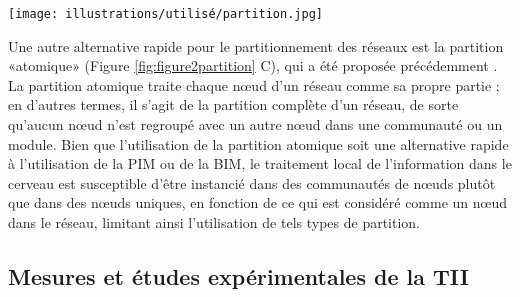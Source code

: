\begin{figure*}[!t]
\center
\texttt{[image: illustrations/utilisé/partition.jpg]}
\caption[Options de partitionnement d'un réseau]{Options de partitionnement d'un réseau. Les ellipses grises délimitent la partition à travers laquelle les informations intégrées sont évaluées. A) Exemple d'un petit réseau. Afin de calculer l'information intégrée dans ce réseau, la plupart des mesures nécessitent de diviser le réseau en une certaine partition et de voir combien d'information supplémentaire le réseau entier transporte par rapport à la somme de ses parties. B) La «bipartition d'information minimale» (BIM) du réseau. La BIM est la partition  qui sépare le système en deux parties et à travers laquelle il y a le moins de flux d'information. C) La «partition de modularité maximale» (PMM). La PMM divise un réseau en modules. La définition d'un module est que ses nœuds sont plus densément connectés les uns aux autres qu'ils ne le sont aux nœuds extérieurs au module. D) La «partition atomique». La partition atomique traite chaque nœud comme sa propre partie. Adapté de \cite{toker2016moving}.}
\label{fig:figure2partition}
\end{figure*}

Une autre alternative rapide pour le partitionnement des réseaux est la partition «atomique» (Figure \ref{fig:figure2partition} C), qui a été proposée précédemment \citep{oizumi2016measuring}. 
La partition atomique traite chaque nœud d'un réseau comme sa propre partie ; en d'autres termes, il s'agit de la partition complète d'un réseau, de sorte qu'aucun nœud n'est regroupé avec un autre nœud dans une communauté ou un module. Bien que l'utilisation de la partition atomique soit une alternative rapide à l'utilisation de la PIM ou de la BIM, le traitement local de l'information dans le cerveau est susceptible d'être instancié dans des communautés de nœuds plutôt que dans des nœuds uniques, en fonction de ce qui est considéré comme un nœud dans le réseau, limitant ainsi l'utilisation de tels types de partition. 

\subsection{Mesures et études expérimentales de la TII}
\label{integrationinformationmesures}

